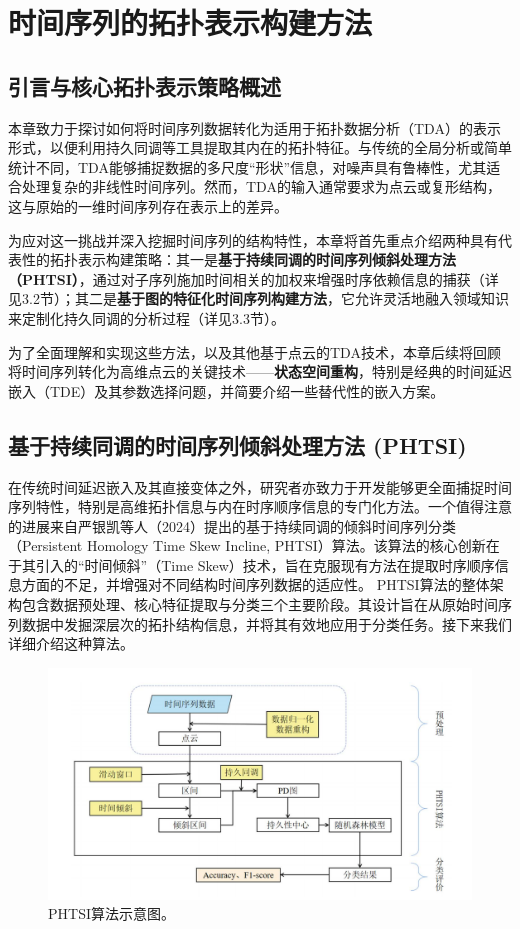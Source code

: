 \section{时间序列的拓扑表示构建方法}

\subsection{引言与核心拓扑表示策略概述} %
本章致力于探讨如何将时间序列数据转化为适用于拓扑数据分析（TDA）的表示形式，以便利用持久同调等工具提取其内在的拓扑特征。与传统的全局分析或简单统计不同，TDA能够捕捉数据的多尺度“形状”信息，对噪声具有鲁棒性，尤其适合处理复杂的非线性时间序列。然而，TDA的输入通常要求为点云或复形结构，这与原始的一维时间序列存在表示上的差异。

为应对这一挑战并深入挖掘时间序列的结构特性，本章将首先重点介绍两种具有代表性的拓扑表示构建策略：其一是\textbf{基于持续同调的时间序列倾斜处理方法（PHTSI）}，通过对子序列施加时间相关的加权来增强时序依赖信息的捕获（详见3.2节）；其二是\textbf{基于图的特征化时间序列构建方法}，它允许灵活地融入领域知识来定制化持久同调的分析过程（详见3.3节）。

为了全面理解和实现这些方法，以及其他基于点云的TDA技术，本章后续将回顾将时间序列转化为高维点云的关键技术——\textbf{状态空间重构}，特别是经典的时间延迟嵌入（TDE）及其参数选择问题，并简要介绍一些替代性的嵌入方案。
%
\subsection{基于持续同调的时间序列倾斜处理方法 (PHTSI)} %
在传统时间延迟嵌入及其直接变体之外，研究者亦致力于开发能够更全面捕捉时间序列特性，特别是高维拓扑信息与内在时序顺序信息的专门化方法。一个值得注意的进展来自严银凯等人（2024）\cite{JSJC202406009}提出的基于持续同调的倾斜时间序列分类（Persistent Homology Time Skew Incline, PHTSI）算法。该算法的核心创新在于其引入的“时间倾斜”（Time Skew）技术，旨在克服现有方法在提取时序顺序信息方面的不足，并增强对不同结构时间序列数据的适应性。
PHTSI算法的整体架构包含数据预处理、核心特征提取与分类三个主要阶段。其设计旨在从原始时间序列数据中发掘深层次的拓扑结构信息，并将其有效地应用于分类任务。接下来我们详细介绍这种算法。

\begin{figure}[thbp!]
    \centering
    \includegraphics[width=1.0\textwidth]{figure/严银凯示意图.png}
    \caption{PHTSI算法示意图。}
    \label{fig:phtsi_algorithm}
\end{figure}


